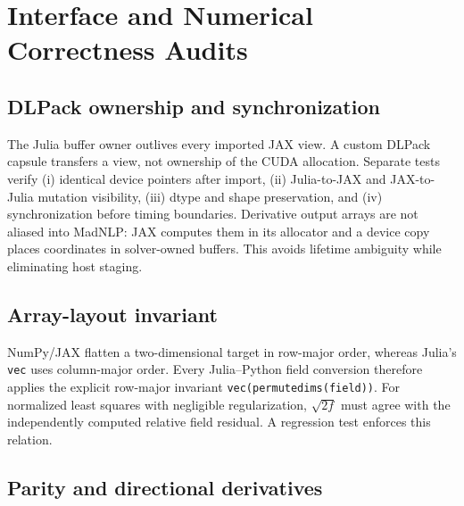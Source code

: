 \section{Interface and Numerical Correctness Audits}
\label{app:audits}

\subsection{DLPack ownership and synchronization}

The Julia buffer owner outlives every imported JAX view.  A custom DLPack
capsule transfers a view, not ownership of the CUDA allocation.  Separate tests
verify (i) identical device pointers after import, (ii) Julia-to-JAX and
JAX-to-Julia mutation visibility, (iii) dtype and shape preservation, and
(iv) synchronization before timing boundaries.  Derivative output arrays are
not aliased into MadNLP: JAX computes them in its allocator and a device copy
places coordinates in solver-owned buffers.  This avoids lifetime ambiguity
while eliminating host staging.

\subsection{Array-layout invariant}

NumPy/JAX flatten a two-dimensional target in row-major order, whereas Julia's
\texttt{vec} uses column-major order.  Every Julia--Python field conversion
therefore applies the explicit row-major invariant
\texttt{vec(permutedims(field))}.  For normalized least squares with negligible
regularization, $\sqrt{2f}$ must agree with the independently computed relative
field residual.  A regression test enforces this relation.

\subsection{Parity and directional derivatives}

